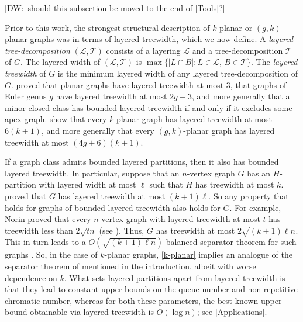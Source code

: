 \documentclass{patmorin}
\newcommand{\note}[2]{{\color{red}[#1:~#2]}}
\begin{document}
\note{DW}{should this subsection be moved to the end of \cref{Tools}?}

Prior to this work, the strongest structural description of $k$-planar or $(g,k)$-planar graphs was in terms of layered treewidth, which we now define.  A \emph{layered tree-decomposition} $(\mathcal{L},\mathcal{T})$ consists of a layering $\mathcal{L}$ and a tree-decomposition $\mathcal{T}$ of $G$. The layered width of $(\mathcal{L},\mathcal{T})$ is $\max\{|L\cap B|: L\in \mathcal{L},\, B\in \mathcal{T}\}$.  The \emph{layered treewidth} of $G$ is the minimum layered width of any layered tree-decomposition of $G$. \citet{dujmovic.morin.ea:layered} proved that planar graphs have layered treewidth at most 3, that graphs of Euler genus $g$ have layered treewidth at most $2g+3$, and more generally that a minor-closed class has bounded layered treewidth if and only if it excludes some apex graph. \citet{dujmovic.eppstein.ea:structure} show that every $k$-planar graph has layered treewidth at most $6(k+1)$, and more generally that 
every $(g,k)$-planar graph has layered treewidth at most $(4g+6)(k+1)$.

If a graph class admits bounded layered partitions, then it also has bounded layered treewidth. In particular, suppose that an $n$-vertex graph $G$ has an $H$-partition with layered width at most $\ell$ such that $H$ has treewidth at most $k$. \citet{dujmovic.joret.ea:planar} proved that $G$ has layered treewidth at most $(k+1)\ell$. So any property that holds for graphs of bounded layered treewidth also holds for $G$. For example, Norin proved that every $n$-vertex graph with layered treewidth at most $t$ has treewidth less than $2\sqrt{tn}$ (see \citep{dujmovic.morin.ea:layered}). Thus, $G$ has treewidth at most $2\sqrt{(k+1)\ell n}$. This in turn leads to a $O(\sqrt{(k+1)\ell n})$ balanced separator theorem for such graphs \citep{RS-II}. So, in the case of $k$-planar graphs, \cref{k-planar} implies an analogue of the separator theorem of \citet{FP08} mentioned in the introduction, albeit with worse dependence on $k$. What sets layered partitions apart from layered treewidth is that they lead to constant upper bounds on the queue-number  and non-repetitive chromatic number, whereas for both these parameters, the best known upper bound obtainable via layered treewidth is $O(\log n)$; see \cref{Applications}. 
\end{document}
